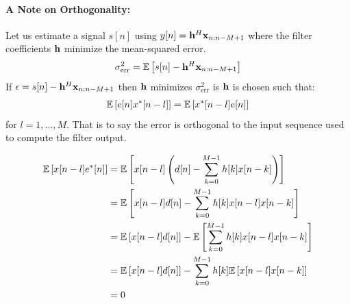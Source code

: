 \documentclass[12pt]{article}
\begin{document}
\paragraph{A Note on Orthogonality:}
Let us estimate a signal $s[n]$ using $y[n] = {\mathbf h}^{H}{\mathbf x}_{n:n-M+1}$ where the filter coefficients  ${\mathbf h}$ minimize the mean-squared error. 
\begin{align}
   \sigma_{\textrm{err}}^2 = {\mathbb E}\left[ s[n] - {\mathbf h}^{H}{\mathbf x}_{n:n-M+1} \right] \nonumber
\end{align}
If $\epsilon = s[n] - {\mathbf h}^{H}{\mathbf x}_{n:n-M+1}$ then ${\mathbf h}$ minimizes $\sigma_{\textrm{err}}^2$ is ${\mathbf h}$ is chosen such that:
\begin{align}
   {\mathbb E}\left[e[n]x^*[n-l]\right] = {\mathbb E}\left[x^*[n-l]e[n]\right] \nonumber
\end{align}
for $l = 1, \ldots,M$. That is to say the error is orthogonal to the input sequence used to compute the filter output. 

\begin{align}
   {\mathbb E}\left[x[n-l]e^*[n]\right] &= {\mathbb E}\left[x[n-l] \left(d[n] -  \sum_{k=0}^{M-1} h[k] x[n-k] \right) \right] \nonumber \\
   &= {\mathbb E}\left[x[n-l]d[n] -  \sum_{k=0}^{M-1} h[k] x[n-l] x[n-k] \right]\nonumber \\
   &= {\mathbb E}\left[x[n-l]d[n]\right] -  {\mathbb E}\left[\sum_{k=0}^{M-1} h[k] x[n-l] x[n-k] \right]\nonumber \\
   &= {\mathbb E}\left[x[n-l]d[n]\right] -  \sum_{k=0}^{M-1} h[k] {\mathbb E}\left[x[n-l] x[n-k] \right]\nonumber \\
   & = 0 \nonumber
\end{align}
\end{document}
